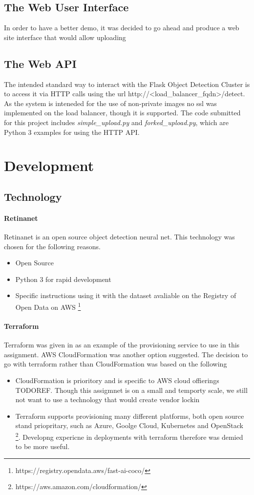\documentclass[conference]{IEEEtran}
\begin{document}
\subsection{The Web User Interface}
In order to have a better demo, it was decided to go ahead and produce a web site interface that would allow uploading 
\subsection{The Web API}
The intended standard way to interact with the Flask Object Detection Cluster is to access it via HTTP calls using the url http://\textless load\_balancer\_fqdn\textgreater/detect. As the system is inteneded for the use of non-private images no ssl was implemented on the load balancer, though it is supported.
The code submitted for this project includes \textit{simple\_upload.py} and \textit{forked\_upload.py}, which are Python 3 examples for using the HTTP API.
\section{Development}
\subsection{Technology}
\paragraph{Retinanet}
Retinanet is an open source object detection neural net. This technology was chosen for the following reasons.
\begin{itemize}
\item Open Source
\item Python 3 for rapid development
\item Specific instructions using it with the dataset avaliable on the Registry of Open Data on AWS \footnote{https://registry.opendata.aws/fast-ai-coco/}
\end{itemize}
\paragraph{Terraform}
Terraform was given in as an example of the provisioning service to use in this assignment. AWS CloudFormation was another option suggested. The decision to go with terraform rather than CloudFormation was based on the following
\begin{itemize}
  \item CloudFormation is prioritory and is specific to AWS cloud offierings TODOREF. Though this assigmnet is on a small and temporty scale, we still not want to use a technology that would create vendor lockin
  \item Terraform supports provisioning many different platforms, both open source stand priopritary, such as Azure, Goolge Cloud, Kubernetes and OpenStack \footnote{https://aws.amazon.com/cloudformation/}. Developng expericne in deployments with terraform therefore was demied to be more useful.
\end{itemize}
\end{document}
